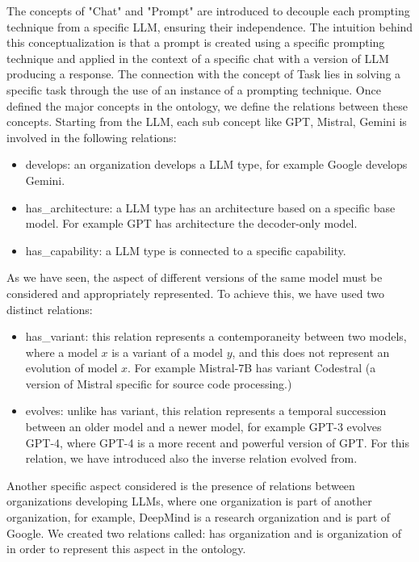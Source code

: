 The concepts of "Chat" and "Prompt" are introduced to decouple each prompting technique from a specific LLM, ensuring their independence.
The intuition behind this conceptualization is that a prompt is created using a specific prompting technique and applied in the context of a specific chat with a version of LLM producing a response.
The connection with the concept of Task lies in solving a specific task through the use of an instance of a prompting technique.
Once defined the major concepts in the ontology, we define the relations between these concepts.
Starting from the LLM, each sub concept like GPT, Mistral, Gemini is involved in the following relations:
\begin{itemize}
    \item develops: an organization develops a LLM type, for example Google develops Gemini.

    \item has\_architecture: a LLM type has an architecture based on a specific base model. For example GPT has architecture the decoder-only model.
    
    \item has\_capability: a LLM type is connected to a specific capability.
\end{itemize}
As we have seen, the aspect of different versions of the same model must be considered and appropriately represented.
To achieve this, we have used two distinct relations:
\begin{itemize}
    \item has\_variant: this relation represents a contemporaneity between two models, where a model $x$ is a variant of a model $y$, and this does not represent an evolution of model $x$. For example Mistral-7B has variant Codestral (a version of Mistral specific for source code processing.)

    \item evolves: unlike has variant, this relation represents a temporal succession between an older model and a newer model, for example GPT-3 evolves GPT-4, where GPT-4 is a more recent and powerful version of GPT. For this relation, we have introduced also the inverse relation evolved from.
\end{itemize}
Another specific aspect considered is the presence of relations between organizations developing LLMs, where one organization is part of another organization, for example, DeepMind is a research organization and is part of Google.
We created two relations called: has organization and is organization of in order to represent this aspect in the ontology.
